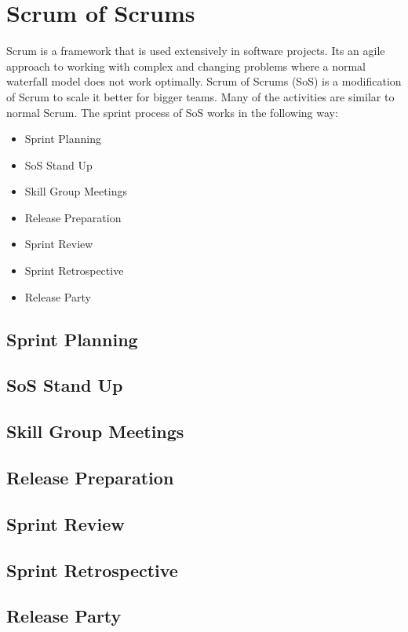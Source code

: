 \section{Scrum of Scrums}
Scrum is a framework that is used extensively in software projects.
Its an agile approach to working with complex and changing problems where a normal waterfall model does not work optimally.
Scrum of Scrums (SoS) is a modification of Scrum to scale it better for bigger teams.
Many of the activities are similar to normal Scrum.
The sprint process of SoS works in the following way:

\begin{itemize}
    \item Sprint Planning
    \item SoS Stand Up
    \item Skill Group Meetings
    \item Release Preparation
    \item Sprint Review
    \item Sprint Retrospective
    \item Release Party
\end{itemize}

\subsection{Sprint Planning}

\subsection{SoS Stand Up}

\subsection{Skill Group Meetings}

\subsection{Release Preparation}

\subsection{Sprint Review}

\subsection{Sprint Retrospective}

\subsection{Release Party}



